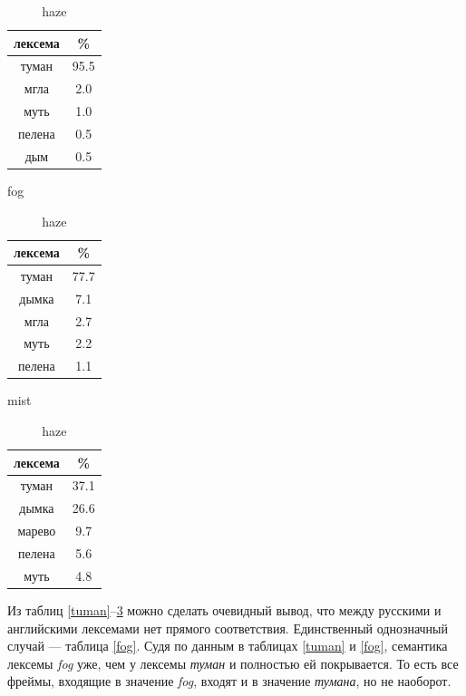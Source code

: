 \begin{table}[H]
\vspace{-8pt}
\begin{small}
\parbox{.33\linewidth}{
\centering
\begin{tabular}{c|c}
\hline
лексема&\%\\
\hline
туман&95.5\\
мгла&2.0\\
муть&1.0\\
пелена&0.5\\
дым&0.5\\
\hline
\end{tabular}
\caption{fog}
\label{fog}
}
\hfill
\parbox{.33\linewidth}{
\centering
\begin{tabular}{c|c}
\hline
лексема&\%\\
\hline
туман&77.7\\
дымка&7.1\\
мгла&2.7\\
муть&2.2\\
пелена&1.1\\
\hline
\end{tabular}
\caption{mist}
\label{mist}
}
\parbox{.33\linewidth}{
\centering
\begin{tabular}{c|c}
\hline
лексема&\%\\
\hline
туман&37.1\\
дымка&26.6\\
марево&9.7\\
пелена&5.6\\
муть&4.8\\
\hline
\end{tabular}
\caption{haze}
\label{haze}
}
\vspace{-8pt}
\end{small}
\end{table}

\par Из таблиц \ref{tuman}--\ref{haze} можно сделать очевидный вывод, что между русскими и английскими лексемами нет прямого соответствия. Единственный однозначный случай --- таблица \ref{fog}. Судя по данным в таблицах \ref{tuman} и \ref{fog}, семантика лексемы \textit{fog} уже, чем у лексемы \textit{туман} и полностью ей покрывается. То есть все фреймы, входящие в значение \textit{fog}, входят и в значение \textit{тумана}, но не наоборот.

